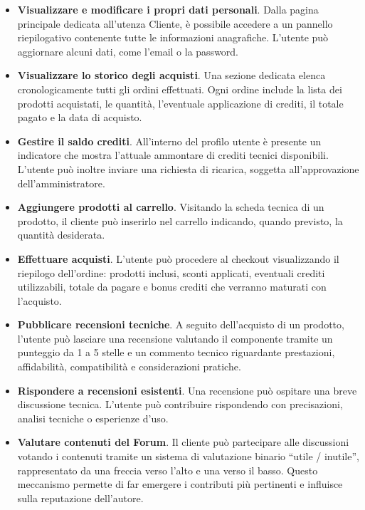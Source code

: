\documentclass[a4paper,12pt]{report}
\begin{document}
\begin{itemize}
    \item \textbf{Visualizzare e modificare i propri dati personali}.  
    Dalla pagina principale dedicata all’utenza Cliente, è possibile accedere
    a un pannello riepilogativo contenente tutte le informazioni anagrafiche.
    L’utente può aggiornare alcuni dati, come l’email o la password.

    \item \textbf{Visualizzare lo storico degli acquisti}.  
    Una sezione dedicata elenca cronologicamente tutti gli ordini effettuati.
    Ogni ordine include la lista dei prodotti acquistati, le quantità,
    l’eventuale applicazione di crediti, il totale pagato e la data di acquisto.

    \item \textbf{Gestire il saldo crediti}.  
    All’interno del profilo utente è presente un indicatore che mostra
    l’attuale ammontare di crediti tecnici disponibili.
    L’utente può inoltre inviare una richiesta di ricarica,
    soggetta all’approvazione dell’amministratore.

    \item \textbf{Aggiungere prodotti al carrello}.  
    Visitando la scheda tecnica di un prodotto,
    il cliente può inserirlo nel carrello indicando, quando previsto,
    la quantità desiderata.

    \item \textbf{Effettuare acquisti}.  
    L’utente può procedere al checkout visualizzando il riepilogo dell’ordine:
    prodotti inclusi, sconti applicati, eventuali crediti utilizzabili,
    totale da pagare e bonus crediti che verranno maturati con l’acquisto.

    \item \textbf{Pubblicare recensioni tecniche}.  
    A seguito dell’acquisto di un prodotto,
    l’utente può lasciare una recensione valutando il componente
    tramite un punteggio da 1 a 5 stelle e un commento tecnico
    riguardante prestazioni, affidabilità, compatibilità e considerazioni pratiche.

    \item \textbf{Rispondere a recensioni esistenti}.  
    Una recensione può ospitare una breve discussione tecnica.
    L’utente può contribuire rispondendo con precisazioni, analisi tecniche
    o esperienze d’uso.

    \item \textbf{Valutare contenuti del Forum}.
    Il cliente può partecipare alle discussioni votando i contenuti tramite un sistema 
    di valutazione binario “utile / inutile”, rappresentato da una freccia verso l’alto 
    e una verso il basso. Questo meccanismo permette di far emergere i contributi più 
    pertinenti e influisce sulla reputazione dell’autore.


\end{itemize}
\end{document}
